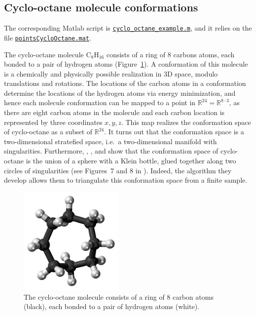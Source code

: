 \documentclass[amscd, amssymb, verbatim]{amsart}[12pt]
\theoremstyle{remark}
\theoremstyle{remark}
\theoremstyle{remark}
\newcommand{\R}{\mathbb{R}}
\newcommand{\cyclo}{\mathrm{C}_8\mathrm{H}_{16}}
\begin{document}
\subsection{Cyclo-octane molecule conformations}

The corresponding Matlab script is \href{https://github.com/appliedtopology/javaplex/tree/master/src/matlab/for_distribution/tutorial_examples/cyclo_octane_example.m}{\texttt{cyclo\_octane\_example.m}}, and it relies on the file \href{https://github.com/appliedtopology/javaplex/tree/master/src/matlab/for_distribution/tutorial_examples/pointsCycloOctane.mat}{\texttt{pointsCycloOctane.mat}}.

The cyclo-octane molecule $\cyclo$ consists of a ring of 8 carbons atoms, each bonded to a pair of hydrogen atoms (Figure~\ref{fig:cyclo}). A conformation of this molecule is a chemically and physically possible realization in 3D space, modulo translations and rotations. The locations of the carbon atoms in a conformation determine the locations of the hydrogen atoms via energy minimization, and hence each molecule conformation can be mapped to a point in $\R^{24}=\R^{8\cdot 3}$, as there are eight carbon atoms in the molecule and each carbon location is represented by three coordinates $x,y,z$. This map realizes the conformation space of cyclo-octane as a subset of $\R^{24}$. It turns out that the conformation space is a two-dimensional stratefied space, i.e.\ a two-dimensional manifold with singularities. Furthermore, \cite{brown2008algorithmic}, \cite{martin2010topology}, and \cite{martin2011non} show that the conformation space of cyclo-octane is the union of a sphere with a Klein bottle, glued together along two circles of singularities (see Figures~7 and 8 in \cite{martin2011non}). Indeed, the algorithm they develop allows them to triangulate this conformation space from a finite sample.

\begin{figure}[htp]
	\begin{center}
    	\includegraphics[width=2in]{Cyclooctane-boat-chair-3D-balls.png}
   	\end{center}
	\caption{The cyclo-octane molecule consists of a ring of 8 carbon atoms (black), each bonded to a pair of hydrogen atoms (white).}
  	\label{fig:cyclo}
\end{figure}
\end{document}
